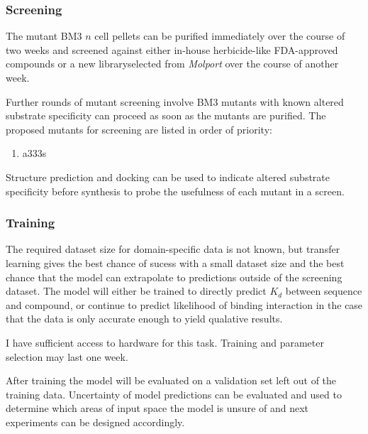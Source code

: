 \documentclass{article}
\begin{document}
\subsubsection{Screening}
The mutant BM3 $n$ cell pellets can be purified immediately over the course of two weeks and screened against either in-house herbicide-like FDA-approved compounds or a new libraryselected from \textit{Molport} over the course of another week.  %
\par
Further rounds of mutant screening involve BM3 mutants with known altered substrate specificity can proceed as soon as the mutants are purified. %
The proposed mutants for screening are listed in order of priority: %
\begin{enumerate} %
	\item a333s
\end{enumerate}
\par
Structure prediction and docking can be used to indicate altered substrate specificity before synthesis to probe the usefulness of each mutant in a screen. %
\par
\subsubsection{Training}
The required dataset size for domain-specific data is not known, but transfer learning gives the best chance of sucess with a small dataset size and the best chance that the model can extrapolate to predictions outside of the screening dataset. The model will either be trained to directly predict $K_d$ between sequence and compound, or continue to predict likelihood of binding interaction in the case that the data is only accurate enough to yield qualative results. %
\par
I have sufficient access to hardware for this task. Training and parameter selection may last one week. %
\par
After training the model will be evaluated on a validation set left out of the training data. Uncertainty of model predictions can be evaluated and used to determine which areas of input space the model is unsure of and next experiments can be designed accordingly. %
\end{document}
